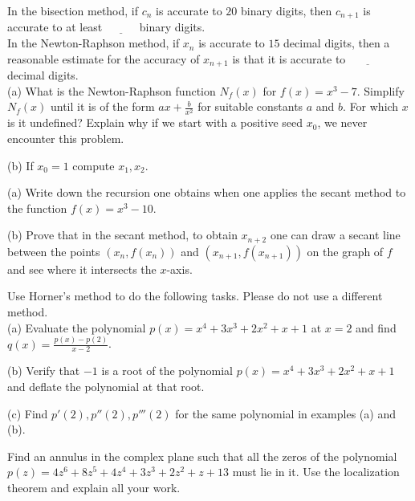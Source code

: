 \documentclass[12pt]{article}
\begin{document}
\newpage
{}
In the bisection method, if $c_n$ is accurate to $20$ binary digits, then $c_{n+1}$ is accurate to at least $\underline{~~~~~~~~~~~~}$ binary digits. \\
In the Newton-Raphson method, if $x_n$ is accurate to $15$ decimal digits, then a reasonable estimate for the accuracy of $x_{n+1}$ is that it is 
accurate to $\underline{~~~~~~~~~~~~~~~}$ decimal digits. \\ 

(a) What is the Newton-Raphson function $N_f(x)$ for $f(x)=x^3-7$. Simplify $N_f(x)$ until it is of the form 
$ax+\frac{b}{x^2}$ for suitable constants $a$ and $b$. For which $x$ is it undefined? Explain why if we start with a positive seed $x_0$, we never 
encounter this problem.

\vspace{2 in}

\noindent
(b) If $x_0=1$ compute $x_1, x_2$.

\newpage
{}
(a) Write down the recursion one obtains when one applies the secant method to the function $f(x)=x^3-10$. 

\vspace{2 in}

\noindent
(b) Prove that in the secant method, to obtain $x_{n+2}$ one can draw a secant line between the points $(x_n,f(x_n))$ and $(x_{n+1},f(x_{n+1}))$ on the 
graph of $f$ and see where it intersects the $x$-axis.

\newpage
{}
Use Horner's method to do the following tasks. Please do not use a different method. \\
(a) Evaluate the polynomial $p(x)=x^4+3x^3+2x^2+x+1$ at $x=2$ and find $q(x)=\frac{p(x)-p(2)}{x-2}$. 

\vspace{ 2 in}

\noindent
(b) Verify that $-1$ is a root of the polynomial $p(x)=x^4+3x^3+2x^2+x+1$ and deflate the polynomial at that root. \\

\vspace{2 in}

\noindent
(c) Find $p'(2),p''(2), p'''(2)$ for the same polynomial in examples (a) and (b).

\newpage
{} Find an annulus in the complex plane such that all the zeros of the polynomial 
$p(z)=4z^6 + 8z^5 + 4z^4 + 3z^3+2z^2+z+13$ must lie in it. Use the localization theorem and explain all your work.
\end{document}
